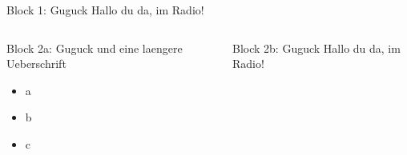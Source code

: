 \documentclass{beamer}
\begin{document}
    \begin{frame}

        \begin{block}{Block 1: Guguck}
            Hallo du da, im Radio!
        \end{block}

        \begin{columns}[t, totalwidth=1.02\textwidth]

            \begin{column}{0.45\linewidth}
                \begin{block}{Block 2a: Guguck und eine laengere Ueberschrift}
                    \begin{itemize}
                        \item a
                        \item b
                        \item c
                    \end{itemize}
                \end{block}
            \end{column}

            \begin{column}{0.45\linewidth}
                \begin{block}{Block 2b: Guguck}
                    Hallo du da, im Radio!
                \end{block}
            \end{column}

        \end{columns}

    \end{frame}
\end{document}
